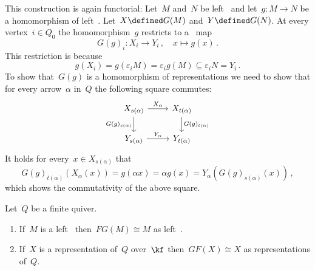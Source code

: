 \begin{remark}
\begin{enumerate}
      This construction is again functorial:
      Let~$M$ and~$N$ be left~{} and let~$g \colon M \to N$ be a homomorphism of left~{}.
      Let~$X \defined G(M)$ and~$Y \defined G(N)$.
      At every vertex~$i \in Q_0$ the homomorphism~$g$ restricts to a~{\klin} map
      \[
                G(g)_i
        \colon  X_i
        \to     Y_i \,,
        \quad   x
        \mapsto g(x) \,.
      \]
      This restriction is {\welldef} because
      \[
                  g(X_i)
        =         g(\varepsilon_i M)
        =         \varepsilon_i g(M)
        \subseteq \varepsilon_i N
        =         Y_i \,.
      \]
      To show that~$G(g)$ is a homomorphism of representations we need to show that for every arrow~$\alpha$ in~$Q$ the following square commutes:
      \[
        \begin{tikzcd}
            X_{s(\alpha)}
            \arrow{r}[above]{X_\alpha}
            \arrow{d}[left]{G(g)_{s(\alpha)}}
          & X_{t(\alpha)}
            \arrow{d}[right]{G(g)_{t(\alpha)}}
          \\
            Y_{s(\alpha)}
            \arrow{r}[above]{Y_\alpha}
          & Y_{t(\alpha)}
        \end{tikzcd}
      \]
      It holds for every~$x \in X_{s(\alpha)}$ that
      \[
          G(g)_{t(\alpha)}( X_\alpha( x ) )
        = g(\alpha x)
        = \alpha g(x)
        = Y_\alpha( G(g)_{s(\alpha)}(x) ) \,,
      \]
      which shows the commutativity of the above square.
  \end{enumerate}
\end{remark}


\begin{theorem}
  \label{quiver rep are modules}
  Let~$Q$ be a finite quiver.
  \begin{enumerate}
    \item
      If~$M$ is a left~{} then~$FG(M) \cong M$ as left~{}.
    \item
      If~$X$ is a representation of~$Q$ over~$\kf$ then~$GF(X) \cong X$ as representations of~$Q$.
  \end{enumerate}
\end{theorem}


